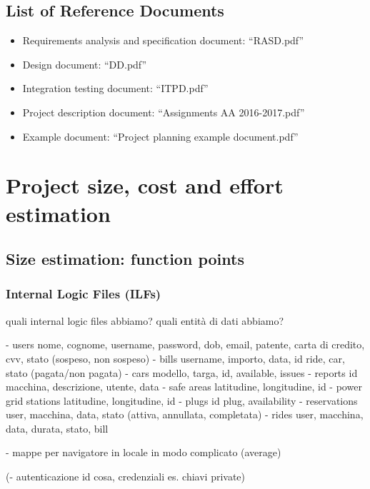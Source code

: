 \documentclass[english]{article}
\begin{document}
\subsection{List of Reference Documents}

\begin{itemize}
	\item{Requirements analysis and specification document: “RASD.pdf”}
	\item{Design document: “DD.pdf”}
	\item{Integration testing document: “ITPD.pdf”}
	\item{Project description document: “Assignments AA 2016-2017.pdf”}
	\item{Example document: “Project planning example document.pdf”}
\end{itemize}

\section{Project size, cost and effort estimation}


\subsection{Size estimation: function points}


\subsubsection{Internal Logic Files (ILFs)}

quali internal logic files abbiamo?
quali entità di dati abbiamo?

- users
nome, cognome, username, password, dob, email, patente, carta di credito, cvv, stato (sospeso, non sospeso)
- bills
username, importo, data, id ride, car, stato (pagata/non pagata)
- cars
modello, targa, id, available, issues
- reports
id macchina, descrizione, utente, data
- safe areas
latitudine, longitudine, id
- power grid stations
latitudine, longitudine, id
- plugs
id plug, availability
- reservations
user, macchina, data, stato (attiva, annullata, completata)
- rides
user, macchina, data, durata, stato, bill

- mappe per navigatore in locale
in modo complicato
(average)

(- autenticazione
id cosa, credenziali es. chiavi private)
\end{document}
